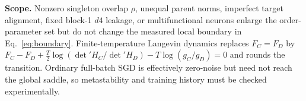 \documentclass[10pt]{article}
\begin{document}
\textbf{Scope.}
Nonzero singleton overlap $\rho$, unequal parent norms, imperfect target alignment, fixed
block-1 $d4$ leakage, or multifunctional neurons enlarge the order-parameter set but do not
change the measured local boundary in Eq.~\eqref{eq:boundary}.  Finite-temperature Langevin
dynamics replaces $F_C=F_D$ by
$F_C-F_D+\tfrac{T}{2}\log(\det' H_C/\det' H_D)-T\log(g_C/g_D)=0$ and rounds the transition.
Ordinary full-batch SGD is effectively zero-noise but need not reach the global saddle, so
metastability and training history must be checked experimentally.
\end{document}
